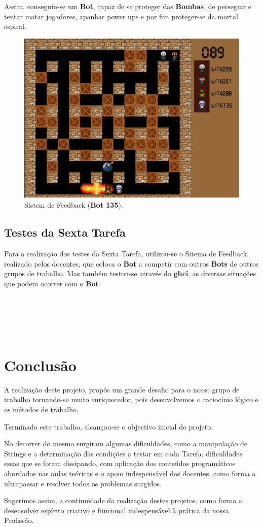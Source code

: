 \documentclass[4apaper]{report}
\begin{document}
Assim, conseguiu-se um \textbf{Bot}, capaz de se proteger das \textbf{Bombas}, de perseguir e tentar matar jogadores, apanhar power ups e por fim proteger-se da mortal espiral.

\begin{figure}[ht]
  \centering
  \includegraphics[scale=0.45]{sistemaFeedBack.jpg}
  \caption{Sistem de Feedback (\textbf{Bot 135}).}
  \label{img4:sistemaFeedback}
\end{figure}

\subsection{Testes da Sexta Tarefa}
Para a realização dos testes da Sexta Tarefa, utilizou-se o Sitema de Feedback, realizado pelos docentes, que coloca o \textbf{Bot} a competir com outros \textbf{Bots} de outros grupos de trabalho. Mas também testou-se através do \textbf{ghci}, as diversas situações que podem ocorrer com o \textbf{Bot}
\begin{verbatim}





\end{verbatim}

\section{Conclusão}
\label{conclusao}
A realização deste projeto, propôs um grande desafio para o nosso grupo de trabalho tornando-se muito enriquecedor, pois desenvolvemos o raciocínio lógico e os métodos de trabalho.

Terminado este trabalho, alcançou-se o objectivo inicial do projeto. 

No decorrer do mesmo surgiram algumas dificuldades, como a manipulação de Strings e a determinação das condições a testar em cada Tarefa, dificuldades essas que se foram dissipando, com aplicação dos conteúdos programáticos abordados nas aulas teóricas e o apoio indespensável dos docentes, como forma a ultrapassar e resolver todos os problemas surgidos.

Sugerimos assim, a continuidade da realização destes projetos, como forma a desensolver espírito criativo e funcional indespensável à prática da nossa Profissão. 
\end{document}
